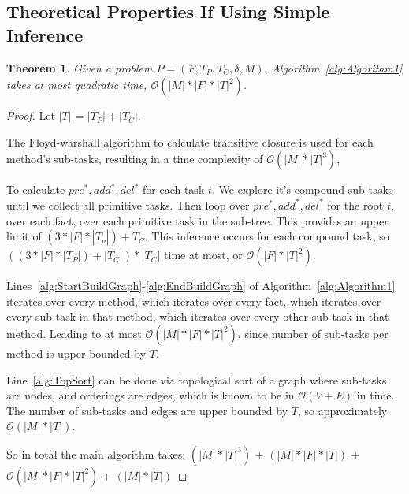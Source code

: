\documentclass[letterpaper]{article} %
\newtheorem{theorem}{Theorem}
\newcommand{\PreS} {\ensuremath{\mathit{pre^{*}}}}
\newcommand{\AddS} {\ensuremath{\mathit{add^{*}}}}
\newcommand{\DelS} {\ensuremath{\mathit{del^{*}}}}
\begin{document}
\subsection{Theoretical Properties If Using Simple Inference}
\begin{theorem}\label{thm:Runtime}
	Given a problem $P = (F, T_P, T_C, \delta, M)$, Algorithm~\ref{alg:Algorithm1} takes at most quadratic time, $\mathcal{O}( |M| * |F| * |T|^2)$. 
\end{theorem}
\begin{proof}  %
	Let $|T|$ = $|T_P| + |T_C|$.
	
	The Floyd-warshall algorithm to calculate transitive closure is used for each method's sub-tasks, resulting in a time complexity of $\mathcal{O}(|M| * |T|^3)$, 
	
	
	To calculate $\PreS, \AddS, \DelS$ for each task $t$. We explore it's compound sub-tasks until we collect all primitive tasks. Then loop over $\PreS, \AddS, \DelS$ for the root $t$, over each fact, over each primitive task in the sub-tree. This provides an upper limit of $(3 * |F| * |T_p|) + T_C$. This inference occurs for each compound task, so $((3 * |F| * |T_P|) + |T_C|) * |T_C|$ time at most, or $\mathcal{O}(|F| * |T|^2)$. %
	
	Lines~\ref{alg:StartBuildGraph}-\ref{alg:EndBuildGraph} of Algorithm~\ref{alg:Algorithm1} iterates over every method, which iterates over every fact, which iterates over every sub-task in that method, which iterates over every other sub-task in that method. Leading to at most $\mathcal{O}(|M| * |F| * |T|^2)$, since number of sub-tasks per method is upper bounded by $T$.
	
	Line~\ref{alg:TopSort} can be done via topological sort of a graph where sub-tasks are nodes, and orderings are edges, which is known to be in $\mathcal{O}(V+E)$ in time. %
	The number of sub-tasks and edges are upper bounded by $T$, so approximately $\mathcal{O}(|M| * |T|)$.
	
	So in total the main algorithm takes: \newline
	$(|M| * |T|^3)$ +          %
	$(|M| * |F| * |T|)$  +    %
	$\mathcal{O}(|M| * |F| * |T|^2)$ +  %
	$(|M| * |T|)$        %
\end{proof}
\end{document}
